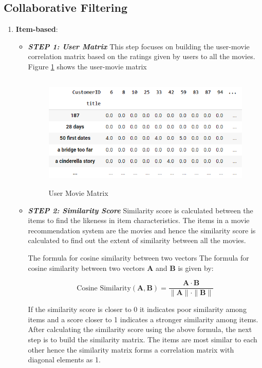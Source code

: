 \documentclass[a4paper,10pt]{article}
\begin{document}
\subsection{Collaborative Filtering}

\begin{enumerate}
    \item \textbf{Item-based}: 
    \vspace{2}
    \begin{itemize}
        \item  \textbf{\textit{STEP 1: User Matrix}}
        \vspace{2}
        This step focuses on building the user-movie correlation matrix based on the ratings given by users to all the movies. Figure \ref{user_movie} shows the user-movie matrix 

        \begin{figure}[ht]
        
\centering
\includegraphics[height=5.5cm]{figures/user_movie.png}
\caption{User Movie Matrix}
\label{user_movie}
\end{figure}
 \item  \textbf{\textit{STEP 2: Similarity Score }} 
        Similarity score is calculated between the items to find the likeness in item characteristics. The items in a movie recommendation system are the movies and hence the similarity score is calculated to find out the extent of similarity between all the movies.

        The formula for cosine similarity between two vectors
The formula for cosine similarity between two vectors $\mathbf{A}$ and $\mathbf{B}$ is given by:

\[
\text{Cosine Similarity}(\mathbf{A}, \mathbf{B}) = \frac{\mathbf{A} \cdot \mathbf{B}}{\|\mathbf{A}\| \cdot \|\mathbf{B}\|}
\]


If the similarity score is closer to 0 it indicates poor similarity among items and a score closer to 1 indicates a stronger similarity among items. After calculating the similarity score using the above formula, the next step is to build the similarity matrix. 
The items are most similar to each other hence the similarity matrix forms a correlation matrix with diagonal elements as 1.


\end{itemize}
\end{enumerate}
\end{document}
